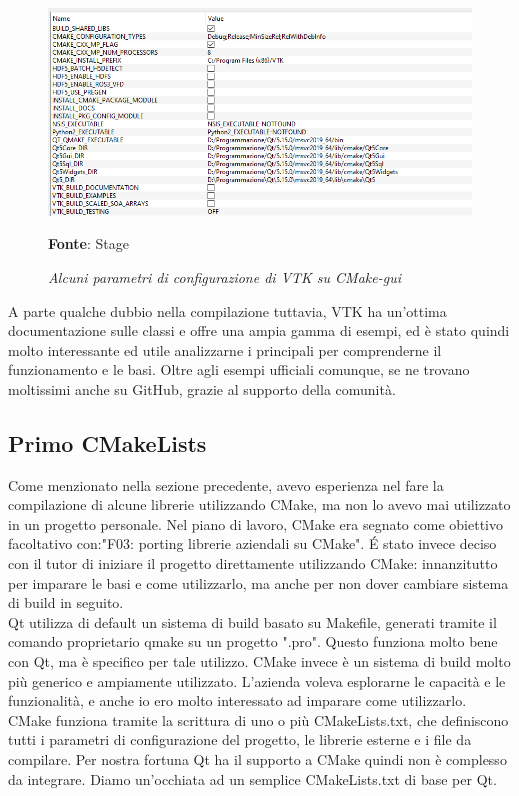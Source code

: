 \begin{figure}[h]
    \centering
    \includegraphics[width=1\textwidth]{immagini/svolgimento/vtkcmake.png}
    \caption{\textit{Alcuni parametri di configurazione di VTK su CMake-gui}}
    \textbf{Fonte}: Stage
    \label{fig: VTK CMAKE}
\end{figure}

A parte qualche dubbio nella compilazione tuttavia, VTK ha un'ottima documentazione sulle classi e offre una ampia gamma di esempi, ed è stato quindi molto interessante ed utile analizzarne i principali per comprenderne il funzionamento e le basi. Oltre agli esempi ufficiali comunque, se ne trovano moltissimi anche su GitHub, grazie al supporto della comunità.

\subsection{Primo CMakeLists}\label{sec:primo-cmake}
Come menzionato nella sezione precedente, avevo esperienza nel fare la compilazione di alcune librerie utilizzando CMake, ma non lo avevo mai utilizzato in un progetto personale. Nel piano di lavoro, CMake era segnato come obiettivo facoltativo con:"F03: porting librerie aziendali su CMake". \'E stato invece deciso con il tutor di iniziare il progetto direttamente utilizzando CMake: innanzitutto per imparare le basi e come utilizzarlo, ma anche per non dover cambiare sistema di build in seguito.
\\
Qt utilizza di default un sistema di build basato su Makefile, generati tramite il comando proprietario qmake su un progetto ".pro". Questo funziona molto bene con Qt, ma è specifico per tale utilizzo. CMake invece è un sistema di build molto più generico e ampiamente utilizzato. L'azienda voleva esplorarne le capacità e le funzionalità, e anche io ero molto interessato ad imparare come utilizzarlo. CMake funziona tramite la scrittura di uno o più CMakeLists.txt, che definiscono tutti i parametri di configurazione del progetto, le librerie esterne e i file da compilare. Per nostra fortuna Qt ha il supporto a CMake quindi non è complesso da integrare. Diamo un'occhiata ad un semplice CMakeLists.txt di base per Qt.

